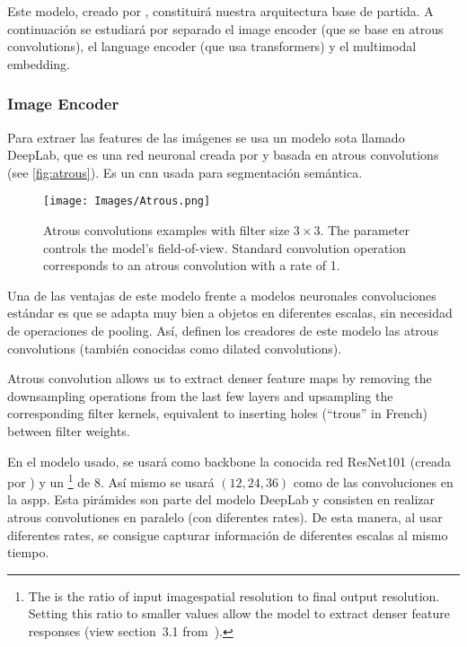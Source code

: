 Este modelo, creado por , constituirá nuestra
arquitectura base de partida. A continuación se estudiará por separado el image
encoder (que se base en atrous convolutions), el language encoder (que usa
transformers) y el multimodal embedding.

\subsubsection{Image Encoder}
Para extraer las features de las imágenes se usa un modelo \gls{sota} llamado
DeepLab, que es una red neuronal creada por  y basada en
atrous convolutions (see \vref{fig:atrous}). Es un \gls{cnn} usada para
segmentación semántica.

\begin{figure}[ht]
  \centering
  \texttt{[image: Images/Atrous.png]}
  \caption[Atrous convolutions examples]{Atrous convolutions examples with
    filter size \(3 \times 3\). The  parameter controls the model's
    field-of-view. Standard convolution operation corresponds to an atrous
    convolution with a rate of 1.}\label{fig:atrous}
\end{figure}

Una de las ventajas de este modelo frente a modelos neuronales convoluciones
estándar es que se adapta muy bien a objetos en diferentes escalas, sin
necesidad de operaciones de pooling. Así, definen los creadores de este modelo
las atrous convolutions (también conocidas como dilated convolutions).

\begin{quoteBox}
  Atrous convolution allows us to extract denser feature maps by removing the
  downsampling operations from the last few layers and upsampling the
  corresponding filter kernels, equivalent to inserting holes (``trous'' in
  French) between filter weights.
  \tcblower{}
\end{quoteBox}

En el modelo usado, se usará como backbone la conocida red ResNet101 (creada
por ) y un \footnote{The
   is the ratio of input imagespatial resolution to final
  output resolution. Setting this ratio to smaller values allow the model to
  extract denser feature responses (view section~3.1
  from~\cite{chen17:rethin}).} de 8. Así mismo se usará \((12, 24, 36)\) como
 de las convoluciones en la \gls{aspp}. Esta pirámides son parte
del modelo DeepLab y consisten en realizar atrous convolutiones en paralelo
(con diferentes rates). De esta manera, al usar diferentes rates, se consigue
capturar información de diferentes escalas al mismo tiempo.


